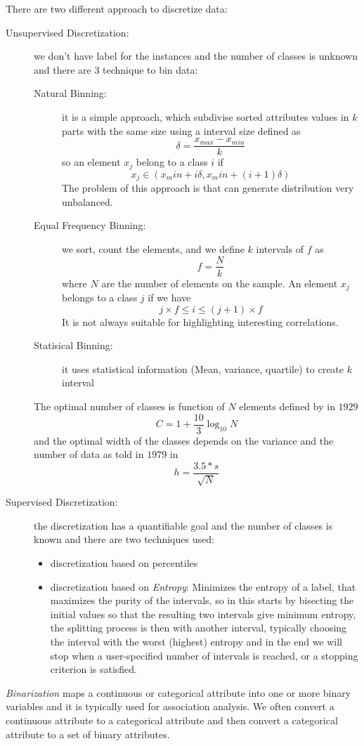 There are two different approach to discretize data:
\begin{description}
   \item [Unsupervised Discretization: ] we don't have label for the instances and the number of classes is unknown and there are 3 technique to bin data:
	   				 \begin{description}
					     \item [Natural Binning: ] it is a simple approach, which subdivise sorted attributes values in $k$ parts
						                       with the same  size using a interval size defined as 
						                       \[ \delta = \frac{x_{max} - x_{min}}{k} \]
								       so an element $x_j$ belong to a class $i$ if 
								       \[ x_j \in (x_min + i \delta, x_min + (i + 1) \delta) \]
								       The problem of this approach is that can generate distribution very unbalanced.
					     \item [Equal Frequency Binning: ]  we sort, count the elements, and we define $k$ intervals of $f$ as 
						     				\[ f = \frac{N}{k} \]
										where $N$ are the number of elements on the sample.\newline
										An element $x_j$ belongs to a class $j$ if we have 
										\[ j \times f \leq i \leq (j + 1) \times f \]
										It is not always suitable for highlighting interesting correlations.
					     \item [Statisical Binning: ] it uses statistical information (Mean, variance, quartile) to create $k$ interval
					\end{description}
					The optimal number of classes is function of $N$ elements defined by \cite{sturges} in $1929$
					\[ C = 1 + \frac{10}{3} \log _{10} N \]
					and the optimal width of the classes depends on the variance and the number of data as told in $1979$ in \cite{scott}
					\[ h = \frac{3.5 * s}{\sqrt{N}} \]

    \item [Supervised Discretization: ] the discretization has a quantifiable goal and the number of classes is known and there are two techniques used:
	    				\begin{itemize}
					    \item discretization based on percentiles
					    \item discretization based on \emph{Entropy}: Minimizes the entropy of a label, that maximizes the purity of the
					          intervals, so in this starts by bisecting the initial values so that the resulting two intervals
						  give minimum entropy, the splitting process is then with another interval, typically
						  choosing the interval with the worst (highest) entropy and in the end we will stop when a user-specified 
						  number of intervals is reached, or a stopping criterion is satisfied.
					\end{itemize}
\end{description}
\emph{Binarization} maps a continuous or categorical attribute into one or more binary variables and it is typically used for association analysis.\newline
We often convert a continuous attribute to a categorical attribute and then convert a categorical attribute to a set of binary attributes.

